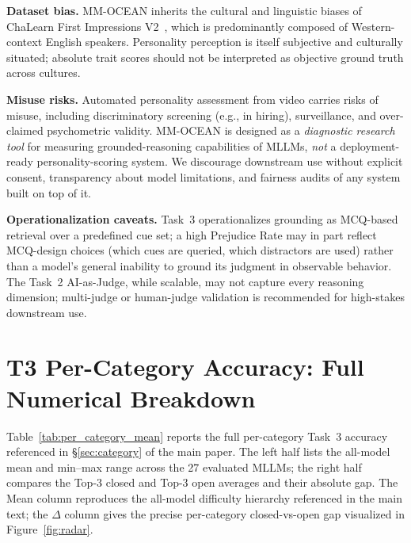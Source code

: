 \documentclass{llmxive}
\providecommand{\benchname}{MM-OCEAN}
\begin{document}
\noindent\textbf{Dataset bias.} \benchname{} inherits the cultural and linguistic biases of ChaLearn First Impressions V2~\cite{escalante2020modeling}, which is predominantly composed of Western-context English speakers. Personality perception is itself subjective and culturally situated; absolute trait scores should not be interpreted as objective ground truth across cultures.

\noindent\textbf{Misuse risks.} Automated personality assessment from video carries risks of misuse, including discriminatory screening (e.g., in hiring), surveillance, and over-claimed psychometric validity. \benchname{} is designed as a \emph{diagnostic research tool} for measuring grounded-reasoning capabilities of MLLMs, \emph{not} a deployment-ready personality-scoring system. We discourage downstream use without explicit consent, transparency about model limitations, and fairness audits of any system built on top of it.

\noindent\textbf{Operationalization caveats.} Task~3 operationalizes grounding as MCQ-based retrieval over a predefined cue set; a high Prejudice Rate may in part reflect MCQ-design choices (which cues are queried, which distractors are used) rather than a model's general inability to ground its judgment in observable behavior. The Task~2 AI-as-Judge, while scalable, may not capture every reasoning dimension; multi-judge or human-judge validation is recommended for high-stakes downstream use.

\section{T3 Per-Category Accuracy: Full Numerical Breakdown}
\label{app:per_category}

Table~\ref{tab:per_category_mean} reports the full per-category Task~3 accuracy referenced in \S\ref{sec:category} of the main paper. The left half lists the all-model mean and min--max range across the 27 evaluated MLLMs; the right half compares the Top-3 closed and Top-3 open averages and their absolute gap. The Mean column reproduces the all-model difficulty hierarchy referenced in the main text; the $\Delta$ column gives the precise per-category closed-vs-open gap visualized in Figure~\ref{fig:radar}.
\end{document}
